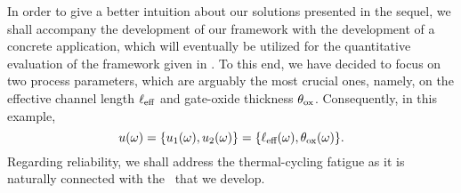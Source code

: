 In order to give a better intuition about our solutions presented in the sequel, we shall accompany the development of our framework with the development of a concrete application, which will eventually be utilized for the quantitative evaluation of the framework given in .
To this end, we have decided to focus on two process parameters, which are arguably the most crucial ones, namely, on the effective channel length $\ell_{\text{eff}}$ and gate-oxide thickness $\theta_{\text{ox}}$.
Consequently, in this example,
\begin{equation} \elab{application-uncertain-parameters}
  \u(\o) = \{ \u_1(\o), \u_2(\o) \} = \{ \Leff(\o), \Tox(\o) \}.
\end{equation}
Regarding reliability, we shall address the thermal-cycling fatigue as it is naturally connected with the \dssta\ that we develop.
